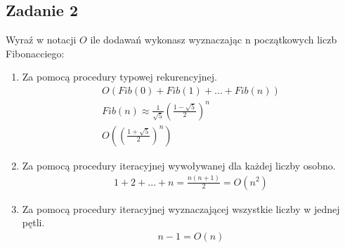 \documentclass{article}
\begin{document}
\subsection*{Zadanie 2}
Wyraź w notacji $O$ ile dodawań wykonasz wyznaczając n początkowych liczb Fibonacciego:
\begin{enumerate}[label=(\alph*)]
    \item Za pomocą procedury typowej rekurencyjnej.
          \begin{gather*}
              O(Fib(0) + Fib(1) + \dots + Fib(n)) \\
              Fib(n) \approx \frac{1}{\sqrt{5}}\left(\frac{1-\sqrt{5}}{2}\right)^n \\
              O\left(\left(\frac{1+\sqrt{5}}{2}\right)^n\right)
          \end{gather*}
    \item Za pomocą procedury iteracyjnej wywoływanej dla każdej liczby osobno.
          \begin{gather*}
              1 + 2 + \dots + n = \frac{n(n+1)}{2} = O(n^2)
          \end{gather*}
    \item Za pomocą procedury iteracyjnej wyznaczającej wszystkie liczby w jednej pętli.
          \begin{gather*}
              n - 1 = O(n)
          \end{gather*}
\end{enumerate}
\end{document}

